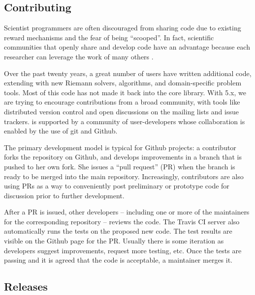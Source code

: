 \subsection{Contributing}


Scientist programmers are often discouraged from sharing code
due to existing reward mechanisms and the fear of being ``scooped''.
In fact, scientific communities that openly share and develop code
have an advantage because each researcher can leverage the work of
many others \cite{Turk:2013hd}.

Over the past twenty years, a great number of users have written
additional code, extending \clawpack with new Riemann solvers,
algorithms, and domain-specific problem tools.  Most of this code
has not made it back into the core library.  With \clawpack 5.x,
we are trying to encourage contributions from a broad community, with
tools like distributed version control and open discussions on 
the mailing lists and issue trackers.
\clawpack is supported by a community of user-developers whose
collaboration is enabled by the use of git and Github.



The primary development model
is typical for Github projects: a contributor forks the repository on Github,
and develops improvements in a branch that is pushed to her own fork.
She issues a ``pull request'' (PR) when the branch is ready to be merged
into the main repository.  Increasingly, contributors are also using
PRs as a way to conveniently post preliminary or prototype code for
discussion prior to further development.

After a PR is issued, other developers -- including one or more of the
maintainers for the corresponding repository -- reviews the code.  The Travis
CI server also automatically runs the tests on the proposed new code.  The test
results are visible on the Github page for the PR.  Usually there is some
iteration as developers suggest improvements, request more testing, etc.
Once the tests are passing and it is agreed that the code is acceptable, a
maintainer merges it.

\subsection{Releases}

